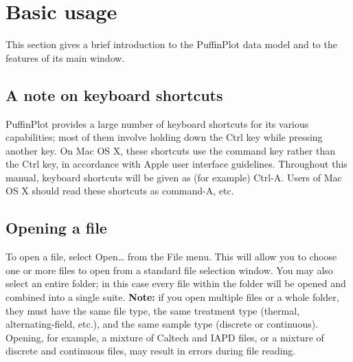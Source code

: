 \documentclass[a4paper,british]{article}
\newcommand{\caps}[1]{\MakeTextUppercase{#1}} %
\begin{document}
\section{Basic usage}

This section gives a brief introduction to the PuffinPlot data model and
to the features of its main window.

\subsection{A note on keyboard shortcuts}

PuffinPlot provides a large number of keyboard shortcuts for its various
capabilities; most of them involve holding down the Ctrl key while
pressing another key. On Mac OS X, these shortcuts use the command key
rather than the Ctrl key, in accordance with Apple user interface
guidelines. Throughout this manual, keyboard shortcuts will be given as
(for example) Ctrl-A. Users of Mac OS X should read these shortcuts as
command-A, etc.

\subsection{Opening a file}

To open a file, select \textsf{Open\ldots} from the \textsf{File} menu.
This will allow you to choose one or more files to open from a standard
file selection window. You may also select an entire folder; in this
case every file within the folder will be opened and combined into a
single suite. \textbf{Note:} if you open multiple files or a whole
folder, they must have the same file type, the same treatment type
(thermal, alternating-field, etc.), and the same sample type (discrete
or continuous). Opening, for example, a mixture of Caltech and
\caps{iapd} files, or a mixture of discrete and continuous files, may
result in errors during file reading.
\end{document}
